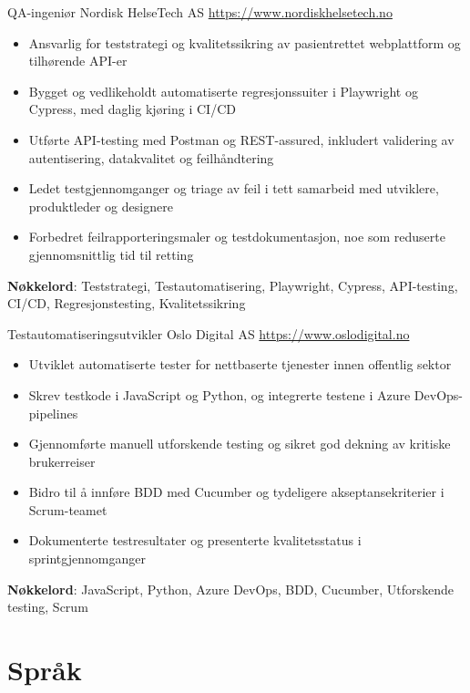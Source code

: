 \documentclass[a4paper, serif, 10pt]{moderncv}
\begin{document}
        {QA-ingeniør}
        {Nordisk HelseTech AS}
        {\url{https://www.nordiskhelsetech.no}}
        {}
        {\begin{itemize}
\item Ansvarlig for teststrategi og kvalitetssikring av pasientrettet webplattform og tilhørende API-er
\item Bygget og vedlikeholdt automatiserte regresjonssuiter i Playwright og Cypress, med daglig kjøring i CI/CD
\item Utførte API-testing med Postman og REST-assured, inkludert validering av autentisering, datakvalitet og feilhåndtering
\item Ledet testgjennomganger og triage av feil i tett samarbeid med utviklere, produktleder og designere
\item Forbedret feilrapporteringsmaler og testdokumentasjon, noe som reduserte gjennomsnittlig tid til retting
\end{itemize}
\textbf{Nøkkelord}: Teststrategi, Testautomatisering, Playwright, Cypress, API-testing, CI/CD, Regresjonstesting, Kvalitetssikring}

        {Testautomatiseringsutvikler}
        {Oslo Digital AS}
        {\url{https://www.oslodigital.no}}
        {}
        {\begin{itemize}
\item Utviklet automatiserte tester for nettbaserte tjenester innen offentlig sektor
\item Skrev testkode i JavaScript og Python, og integrerte testene i Azure DevOps-pipelines
\item Gjennomførte manuell utforskende testing og sikret god dekning av kritiske brukerreiser
\item Bidro til å innføre BDD med Cucumber og tydeligere akseptansekriterier i Scrum-teamet
\item Dokumenterte testresultater og presenterte kvalitetsstatus i sprintgjennomganger
\end{itemize}
\textbf{Nøkkelord}: JavaScript, Python, Azure DevOps, BDD, Cucumber, Utforskende testing, Scrum}
\section{Språk}

\end{document}
